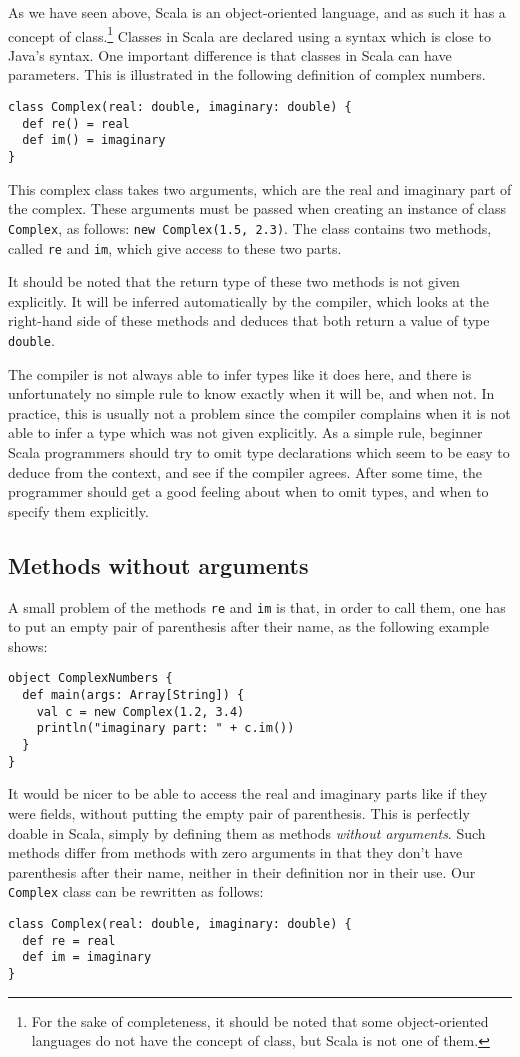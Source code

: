 \documentclass[a4paper,11pt,twoside,titlepage]{article}
\begin{document}
As we have seen above, Scala is an object-oriented language, and as
such it has a concept of class.\footnote{For the sake of completeness,
  it should be noted that some object-oriented languages do not have
  the concept of class, but Scala is not one of them.}
Classes in Scala are declared using a syntax which is close to
Java's syntax. One important difference is that classes in Scala can
have parameters. This is illustrated in the following definition of
complex numbers.
\begin{lstlisting}
class Complex(real: double, imaginary: double) {
  def re() = real
  def im() = imaginary
}
\end{lstlisting}
This complex class takes two arguments, which are the real and
imaginary part of the complex. These arguments must be passed when
creating an instance of class \lstinline?Complex?, as follows:
\lstinline?new Complex(1.5, 2.3)?. The class contains two methods,
called \lstinline?re? and \lstinline?im?, which give access to these
two parts.

It should be noted that the return type of these two methods is not
given explicitly. It will be inferred automatically by the compiler,
which looks at the right-hand side of these methods and deduces that
both return a value of type \lstinline?double?.

The compiler is not always able to infer types like it does here, and
there is unfortunately no simple rule to know exactly when it will be,
and when not. In practice, this is usually not a problem since the
compiler complains when it is not able to infer a type which was not
given explicitly. As a simple rule, beginner Scala programmers should
try to omit type declarations which seem to be easy to deduce from the
context, and see if the compiler agrees. After some time, the
programmer should get a good feeling about when to omit types, and
when to specify them explicitly.

\subsection*{Methods without arguments}
\label{sec:meth-wo-args}

A small problem of the methods \lstinline?re? and \lstinline?im? is that, in
order to call them, one has to put an empty pair of parenthesis after
their name, as the following example shows:
\begin{lstlisting}
object ComplexNumbers {
  def main(args: Array[String]) {
    val c = new Complex(1.2, 3.4)
    println("imaginary part: " + c.im())
  }
}
\end{lstlisting}
It would be nicer to be able to access the real and imaginary parts
like if they were fields, without putting the empty pair of
parenthesis. This is perfectly doable in Scala, simply by defining
them as methods \emph{without arguments}. Such methods differ from
methods with zero arguments in that they don't have parenthesis after
their name, neither in their definition nor in their use. Our
\lstinline?Complex? class can be rewritten as follows:
\begin{lstlisting}
class Complex(real: double, imaginary: double) {
  def re = real
  def im = imaginary
}
\end{lstlisting}
\end{document}
